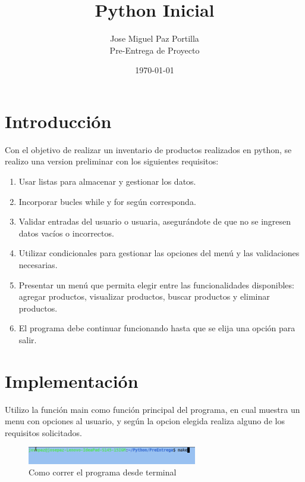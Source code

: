 \documentclass[12pt]{article}
\title{Python Inicial}
\author{Jose Miguel Paz Portilla\\Pre-Entrega de Proyecto}
\date{\today}
\begin{document}
\maketitle
\thispagestyle{empty}
\newpage

\tableofcontents
\newpage

\section{Introducción}

Con el objetivo de realizar un inventario de productos realizados en python, se realizo una version preliminar con los siguientes requisitos:

\begin{enumerate}
	\item Usar listas para almacenar y gestionar los datos.
	\item Incorporar bucles while y for según corresponda. 
	\item Validar entradas del usuario o usuaria, asegurándote de que no se ingresen datos vacíos o incorrectos.
	\item Utilizar condicionales para gestionar las opciones del menú y las validaciones necesarias.
	\item Presentar un menú que permita elegir entre las funcionalidades disponibles: agregar productos, visualizar productos, buscar productos y eliminar productos.
	\item El programa debe continuar funcionando hasta que se elija una opción para salir.
\end{enumerate}

\section{Implementación}

Utilizo la función main como función principal del programa, en cual muestra un menu con opciones al usuario, y según la opcion elegida realiza alguno de los requisitos solicitados.

\begin{figure}[H]
	\centering
	\setlength{\fboxrule}{0pt}
	\includegraphics[width=0.66\textwidth]{img7.png}
	\caption{Como correr el programa desde terminal}
	\label{fig:Correr el programa}
\end{figure}  
\end{document}
